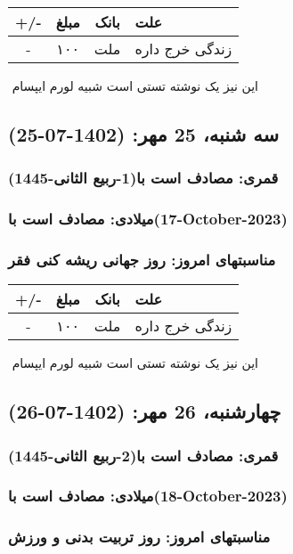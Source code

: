 \documentclass{article}
\newcommand{\rnote}[1]{\marginpar{\textcolor{color}{\StrSubstitute{\##1}{ }{\_}}}}
\newcommand{\myRow}[4]{
    #1 & #2 & #3 & #4 \\ \hline
}
\begin{document}
\begin{tabular}{ | c | c | c | p{5cm} |}
    \hline
    \myRow{ +/- }{مبلغ}{بانک}{علت}
    \myRow{-}{۱۰۰}{ملت}{زندگی خرج داره}
\end{tabular}
\newline
\newline

‌
\rnote{تست}
این نیز یک نوشته تستی است شبیه لورم ایپسام




\newpage
{}
\textcolor{color}{
\section{ سه شنبه، 25 مهر: (1402-07-25) }
\subsubsection*{قمری: مصادف است با(1-ربیع الثانی-1445)} 
\subsubsection*{میلادی: مصادف است با(17-October-2023)}
\subsubsection*{مناسبتهای امروز: روز جهانی ریشه کنی فقر}
}


\begin{tabular}{ | c | c | c | p{5cm} |}
    \hline
    \myRow{ +/- }{مبلغ}{بانک}{علت}
    \myRow{-}{۱۰۰}{ملت}{زندگی خرج داره}
\end{tabular}
\newline
\newline

‌
\rnote{تست}
این نیز یک نوشته تستی است شبیه لورم ایپسام




\newpage
{}
\textcolor{color}{
\section{ چهارشنبه، 26 مهر: (1402-07-26) }
\subsubsection*{قمری: مصادف است با(2-ربیع الثانی-1445)} 
\subsubsection*{میلادی: مصادف است با(18-October-2023)}
\subsubsection*{مناسبتهای امروز: روز تربیت بدنی و ورزش}
}
\end{document}
